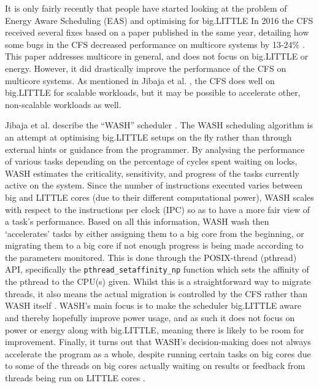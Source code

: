 It is only fairly recently that people have started looking at the problem of
Energy Aware Scheduling (EAS) and optimising for big.LITTLE  In 2016 the CFS
received several fixes based on a paper published in the same year, detailing
how some bugs in the CFS decreased performance on multicore systems by 13-24\%
\cite{lozi_linux_2016}. This paper addresses multicore in general, and does not
focus on big.LITTLE or energy. However, it did drastically improve the
performance of the CFS on multicore systems. As mentioned in Jibaja et al.
\cite{jibaja_portable_2016}, the CFS does well on big.LITTLE for scalable
workloads, but it may be possible to accelerate other, non-scalable workloads as
well.

Jibaja et al. describe the ``WASH'' scheduler \cite{jibaja_portable_2016}. The
WASH scheduling algorithm is an attempt at optimising big.LITTLE setups on the
fly rather than through external hints or guidance from the programmer. By
analysing the performance of various tasks depending on the percentage of cycles
spent waiting on locks, WASH estimates the criticality, sensitivity, and
progress of the tasks currently active on the system. Since the number of
instructions executed varies between big and LITTLE cores (due to their
different computational power), WASH scales with respect to the instructions per
clock (IPC) so as to have a more fair view of a task's performance. Based on all
this information, WASH wash then `accelerates' tasks by either assigning them to
a big core from the beginning, or migrating them to a big core if not enough
progress is being made according to the parameters monitored. This is done
through the POSIX-thread (pthread) API, specifically the
\texttt{pthread\_setaffinity\_np} function which sets the affinity of the
pthread to the CPU(s) given. Whilst this is a straightforward way to migrate
threads, it also means the actual migration is controlled by the CFS rather
than WASH itself \cite{yu_colab_2020}. WASH's main focus is to make the
scheduler big.LITTLE aware and thereby hopefully improve power usage, and as
such it does not focus on power or energy along with big.LITTLE, meaning there
is likely to be room for improvement. Finally, it turns out that WASH's
decision-making does not always accelerate the program as a whole, despite
running certain tasks on big cores due to some of the threads on big cores
actually waiting on results or feedback from threads being run on LITTLE cores
\cite{yu_colab_2020}.

